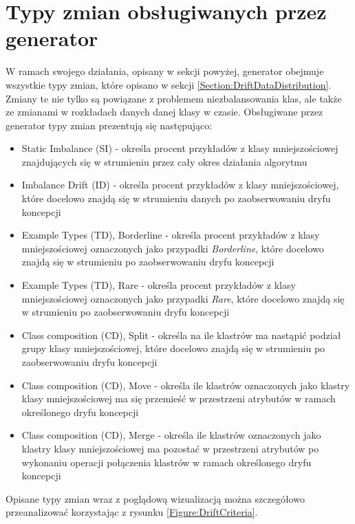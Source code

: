 \section{Typy zmian obsługiwanych przez generator}

\noindent W ramach swojego działania, opisany w sekcji powyżej, generator obejmuje wszystkie typy zmian, które opisano w sekcji \ref{Section:DriftDataDistribution}. Zmiany te nie tylko są powiązane z problemem niezbalansowania klas, ale także ze zmianami w rozkładach danych danej klasy w czasie. Obsługiwane przez generator typy zmian prezentują się następująco:

\begin{itemize}
    \item Static Imbalance (SI) - określa procent przykładów z klasy mniejszościowej znajdujących się w strumieniu przez cały okres działania algorytmu
    \item Imbalance Drift (ID) - określa procent przykładów z klasy mniejszościowej, które docelowo znajdą się w strumieniu danych po zaobserwowaniu dryfu koncepcji
    \item Example Types (TD), Borderline - określa procent przykładów z klasy mniejszościowej oznaczonych jako przypadki \textit{Borderline}, które docelowo znajdą się w strumieniu po zaobserwowaniu dryfu koncepcji
    \item Example Types (TD), Rare - określa procent przykładów z klasy mniejszościowej oznaczonych jako przypadki \textit{Rare}, które docelowo znajdą się w strumieniu po zaobserwowaniu dryfu koncepcji
    \item Class composition (CD), Split - określa na ile klastrów ma nastąpić podział grupy klasy mniejszościowej, które docelowo znajdą się w strumieniu po zaobserwowaniu dryfu koncepcji
    \item Class composition (CD), Move - określa ile klastrów oznaczonych jako klastry klasy mniejszościowej ma się przemieść w przestrzeni atrybutów w ramach określonego dryfu koncepcji
    \item Class composition (CD), Merge - określa ile klastrów oznaczonych jako klastry klasy mniejszościowej ma pozostać w przestrzeni atrybutów po wykonaniu operacji połączenia klastrów w ramach określonego dryfu koncepcji
\end{itemize}

\newpage

\noindent Opisane typy zmian wraz z poglądową wizualizacją można szczegółowo przeanalizować korzystając z rysunku \ref{Figure:DriftCriteria}.

